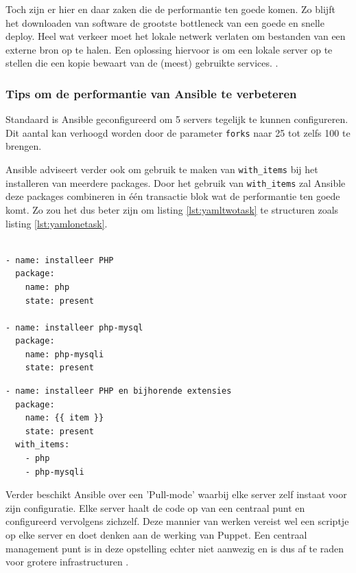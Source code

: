  Toch zijn er hier en daar zaken die de performantie ten goede komen. Zo blijft het downloaden van software de grootste bottleneck van een goede en snelle deploy. Heel wat verkeer moet het lokale netwerk verlaten om bestanden van een externe bron op te halen. Een oplossing hiervoor is om een lokale server op te stellen die een kopie bewaart van de (meest) gebruikte services. \autocite{AnsibleTuning}.
 
 \subsubsection{Tips om de performantie van Ansible te verbeteren}
 Standaard is Ansible geconfigureerd om 5 servers tegelijk te kunnen configureren. Dit aantal kan verhoogd worden door de parameter \texttt{\gls{fork}s} naar 25 tot zelfs 100 te brengen. 
 
Ansible adviseert verder ook om gebruik te maken van \texttt{with\_items} bij het installeren van meerdere packages. Door het gebruik van \texttt{with\_items} zal Ansible deze packages combineren in \'e\'en transactie blok wat de performantie ten goede komt. Zo zou het dus beter zijn om listing \ref{lst:yamltwotask} te structuren zoals listing \ref{lst:yamlonetask}. 


\begin{lstlisting}[frame=single]

- name: installeer PHP
  package:
    name: php
    state: present

- name: installeer php-mysql
  package:
    name: php-mysqli
    state: present
\end{lstlisting}

\begin{lstlisting}[frame=single]
- name: installeer PHP en bijhorende extensies
  package:
    name: {{ item }}
    state: present
  with_items:
    - php
    - php-mysqli
\end{lstlisting}

  Verder beschikt Ansible over een 'Pull-mode' waarbij elke server zelf instaat voor zijn configuratie. Elke server haalt de code op van een centraal punt en configureerd vervolgens zichzelf. Deze mannier van werken vereist wel een scriptje op elke server en doet denken aan de werking van Puppet. Een centraal management punt is in deze opstelling echter niet aanwezig en is dus af te raden voor grotere infrastructuren \autocite{AnsibleTuning} .
  
